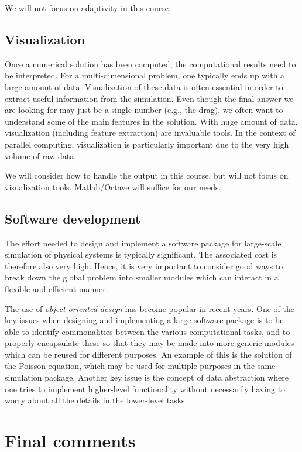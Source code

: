 \documentclass[11pt]{article}
\begin{document}
We will not focus on adaptivity in this course.

\subsection{Visualization}
 
Once a numerical solution has been computed, the computational 
results need to be interpreted.
For a multi-dimensional problem, one typically
ends up with a large amount of data. Visualization of these
data is often essential in order to extract useful 
information from the simulation. Even though the final 
answer we are looking for may just be a single number
(e.g., the drag), we often want to understand some of 
the main features in the solution. With huge amount of data,
visualization (including feature extraction) are invaluable tools. 
In the context of parallel computing, visualization is particularly 
important due to the very high volume of raw data.

We will consider how to handle the output in this course, but will
not focus on visualization tools. Matlab/Octave will suffice for our needs.

\subsection{Software development}

The effort needed to design and implement a software package for
large-scale simulation of physical systems is typically significant.
The associated cost is therefore also very high. Hence, it is  
very important to consider good ways to break down the 
global problem into smaller modules which can interact 
in a flexible and efficient manner. 

The use of {\em object-oriented design} has become popular
in recent years. One of the key issues when designing 
and implementing a large software package is to be
able to identify commonalities between the various computational 
tasks, and to properly encapsulate these so that they may be made into 
more generic modules which can be reused for different purposes. 
An example of this is the solution of the Poisson equation,
which may be used for multiple purposes in the same simulation
package. Another key issue is the concept of data abstraction
where one tries to implement higher-level functionality without
necessarily having to worry about all the details in the 
lower-level tasks. 

\section{Final comments}
\end{document}
